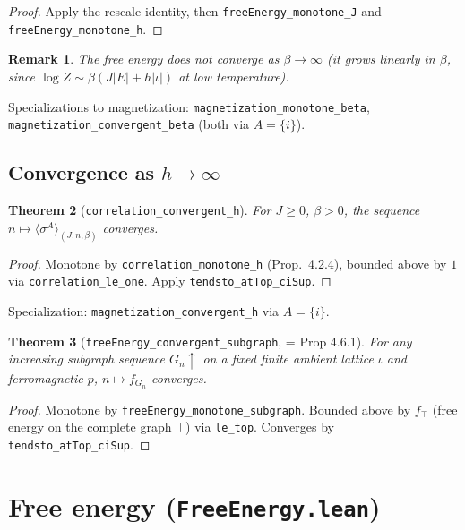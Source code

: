 \documentclass[a4paper,11pt]{article}
\newtheorem{theorem}{Theorem}
\newtheorem{remark}[theorem]{Remark}
\begin{document}
\begin{proof}
Apply the rescale identity, then \texttt{freeEnergy\_monotone\_J} and
\texttt{freeEnergy\_monotone\_h}.
\end{proof}

\begin{remark}
The free energy does not converge as $\beta\to\infty$
(it grows linearly in $\beta$, since $\log Z \sim \beta(J|E| + h|\iota|)$
at low temperature).
\end{remark}

Specializations to magnetization:
\texttt{magnetization\_monotone\_beta},
\texttt{magnetization\_convergent\_beta} (both via $A = \{i\}$).

\subsection{Convergence as \texorpdfstring{$h \to \infty$}{h to infinity}}

\begin{theorem}[\texttt{correlation\_convergent\_h}]
For $J \ge 0$, $\beta > 0$, the sequence
$n \mapsto \langle\sigma^A\rangle_{(J,n,\beta)}$ converges.
\end{theorem}

\begin{proof}
Monotone by \texttt{correlation\_monotone\_h} (Prop.~4.2.4),
bounded above by $1$ via \texttt{correlation\_le\_one}.
Apply \texttt{tendsto\_atTop\_ciSup}.
\end{proof}

Specialization: \texttt{magnetization\_convergent\_h} via $A = \{i\}$.

\begin{theorem}[\texttt{freeEnergy\_convergent\_subgraph}, = Prop 4.6.1]
For any increasing subgraph sequence $G_n\uparrow$ on a fixed finite ambient
lattice $\iota$ and ferromagnetic $p$, $n\mapsto f_{G_n}$ converges.
\end{theorem}

\begin{proof}
Monotone by \texttt{freeEnergy\_monotone\_subgraph}.
Bounded above by $f_{\top}$ (free energy on the complete graph $\top$)
via \texttt{le\_top}. Converges by \texttt{tendsto\_atTop\_ciSup}.
\end{proof}

\section{Free energy (\texttt{FreeEnergy.lean})}
\end{document}
